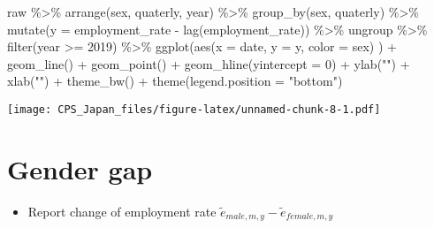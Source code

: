 \documentclass[
]{book}
\newenvironment{Shaded}{\begin{snugshade}}{\end{snugshade}}
\newcommand{\AttributeTok}[1]{\textcolor[rgb]{0.77,0.63,0.00}{#1}}
\newcommand{\DecValTok}[1]{\textcolor[rgb]{0.00,0.00,0.81}{#1}}
\newcommand{\FunctionTok}[1]{\textcolor[rgb]{0.00,0.00,0.00}{#1}}
\newcommand{\NormalTok}[1]{#1}
\newcommand{\SpecialCharTok}[1]{\textcolor[rgb]{0.00,0.00,0.00}{#1}}
\newcommand{\StringTok}[1]{\textcolor[rgb]{0.31,0.60,0.02}{#1}}
\providecommand{\tightlist}{%
  \setlength{\itemsep}{0pt}\setlength{\parskip}{0pt}}
\begin{document}
\begin{Shaded}
\begin{Highlighting}[]
\NormalTok{raw }\SpecialCharTok{\%\textgreater{}\%}
  \FunctionTok{arrange}\NormalTok{(sex,}
\NormalTok{          quaterly,}
\NormalTok{          year) }\SpecialCharTok{\%\textgreater{}\%}
  \FunctionTok{group\_by}\NormalTok{(sex,}
\NormalTok{           quaterly) }\SpecialCharTok{\%\textgreater{}\%}
  \FunctionTok{mutate}\NormalTok{(}\AttributeTok{y =}\NormalTok{ employment\_rate }\SpecialCharTok{{-}} \FunctionTok{lag}\NormalTok{(employment\_rate)) }\SpecialCharTok{\%\textgreater{}\%}
\NormalTok{  ungroup }\SpecialCharTok{\%\textgreater{}\%}
  \FunctionTok{filter}\NormalTok{(year }\SpecialCharTok{\textgreater{}=} \DecValTok{2019}\NormalTok{) }\SpecialCharTok{\%\textgreater{}\%}
  \FunctionTok{ggplot}\NormalTok{(}\FunctionTok{aes}\NormalTok{(}\AttributeTok{x =}\NormalTok{ date,}
             \AttributeTok{y =}\NormalTok{ y,}
             \AttributeTok{color =}\NormalTok{ sex)}
\NormalTok{         ) }\SpecialCharTok{+}
  \FunctionTok{geom\_line}\NormalTok{() }\SpecialCharTok{+}
  \FunctionTok{geom\_point}\NormalTok{() }\SpecialCharTok{+}
  \FunctionTok{geom\_hline}\NormalTok{(}\AttributeTok{yintercept =} \DecValTok{0}\NormalTok{) }\SpecialCharTok{+}
  \FunctionTok{ylab}\NormalTok{(}\StringTok{""}\NormalTok{) }\SpecialCharTok{+}
  \FunctionTok{xlab}\NormalTok{(}\StringTok{""}\NormalTok{) }\SpecialCharTok{+}
  \FunctionTok{theme\_bw}\NormalTok{() }\SpecialCharTok{+}
  \FunctionTok{theme}\NormalTok{(}\AttributeTok{legend.position =} \StringTok{"bottom"}\NormalTok{)}
\end{Highlighting}
\end{Shaded}

\texttt{[image: CPS\_Japan\_files/figure-latex/unnamed-chunk-8-1.pdf]}

\hypertarget{gender-gap-1}{%
\section{Gender gap}\label{gender-gap-1}}

\begin{itemize}
\tightlist
\item
  Report change of employment rate \(\tilde e_{male,m,y} - \tilde e_{female,m,y}\)
\end{itemize}
\end{document}
